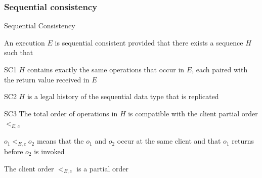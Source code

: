 \subsubsection{Sequential consistency}

\begin{frame}[t]{Sequential Consistency}

\begin{definition}
An execution $E$ is sequential consistent provided that there exists a sequence $H$ such that
\BE	
\item[SC1] $H$ contains exactly the same operations that occur in $E$, each paired with the return value received in $E$
\item[SC2] $H$ is a legal history of the sequential data type that is replicated
\item[SC3] The total order of operations in $H$ is \alert{compatible} with the client partial order $<_{E,c}$
\EE	
\end{definition}

\BI
\item $o_1 <_{E,c} o_2$ means that the $o_1$ and $o_2$ occur at the same client and that $o_1$ returns before $o_2$ is invoked
\item The \alert{client order} $<_{E,c}$ is a partial order
\EI

\end{frame}


